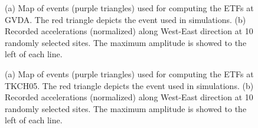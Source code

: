 {\clearpage
{}
\begin{figure}[!ht]
   \hfil
  \caption{(a) Map of events (purple triangles) used for computing the ETFs at GVDA. The red triangle depicts the event used in simulations. (b) Recorded accelerations (normalized) along West-East direction at 10 randomly selected sites. The maximum amplitude is showed to the left of each line.}
  \label{fig:etf-S1}
\end{figure}


\clearpage
{}
\begin{figure}[!ht]
   \hfil
  \caption{(a) Map of events (purple triangles) used for computing the ETFs at TKCH05. The red triangle depicts the event used in simulations. (b) Recorded accelerations (normalized) along West-East direction at 10 randomly selected sites. The maximum amplitude is showed to the left of each line.}
  \label{fig:etf-S2}
\end{figure}


}
